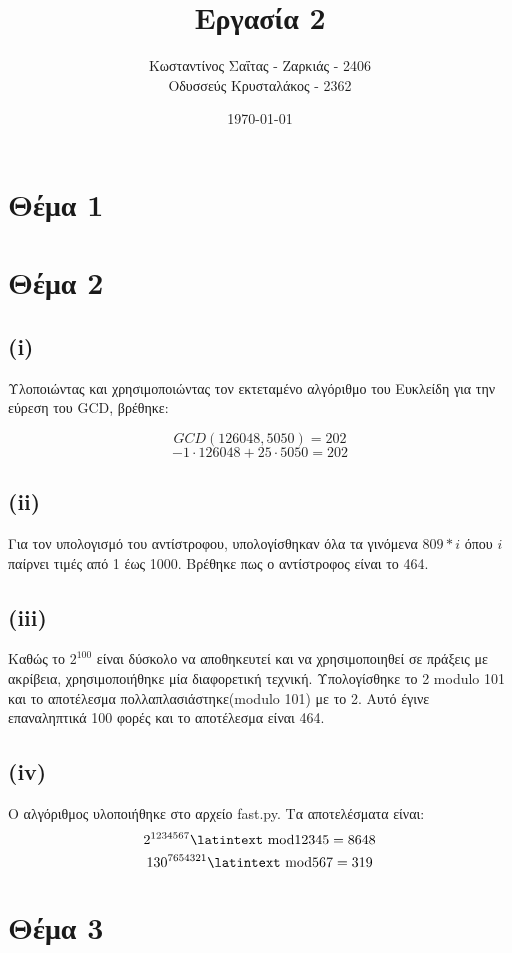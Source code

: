 \documentclass[a4paper, 11pt]{article}
\title{Εργασία 2}
\author{Κωσταντίνος Σαΐτας - Ζαρκιάς - 2406 \\ Οδυσσεύς Κρυσταλάκος - 2362}
\date{\today}
\newcommand{\lt}{\latintext}
\begin{document}
\maketitle

\section*{Θέμα 1}


\newpage


\section*{Θέμα 2}
\subsection*{({\lt i})}
Υλοποιώντας και χρησιμοποιώντας τον εκτεταμένο αλγόριθμο του Ευκλείδη για την εύρεση του {\lt GCD}, βρέθηκε:

\[GCD(126048, 5050) = 202\]
\[-1 \cdot 126048 + 25 \cdot 5050 = 202\]

\subsection*{({\lt ii})}
Για τον υπολογισμό του αντίστροφου, υπολογίσθηκαν όλα τα γινόμενα $ 809 * i $ όπου $i$ παίρνει τιμές από 1 έως 1000. Βρέθηκε πως ο αντίστροφος είναι το 464.

\subsection*{({\lt iii})}
Καθώς το $2^{100}$ είναι δύσκολο να αποθηκευτεί και να χρησιμοποιηθεί σε πράξεις με ακρίβεια, χρησιμοποιήθηκε μία διαφορετική τεχνική. Υπολογίσθηκε το 2 {\lt modulo} 101 και το αποτέλεσμα πολλαπλασιάστηκε({\lt modulo} 101) με το 2. Αυτό έγινε επαναληπτικά 100 φορές και το αποτέλεσμα είναι 464.

\subsection*{({\lt iv})}
Ο αλγόριθμος υλοποιήθηκε στο αρχείο {\lt fast.py}. Τα αποτελέσματα είναι:
\[2^{1234567} \textrm{\lt mod} 12345 = 8648\]
\[130^{7654321} \textrm{\lt mod} 567 = 319\]
\newpage


\section*{Θέμα 3}
\end{document}
